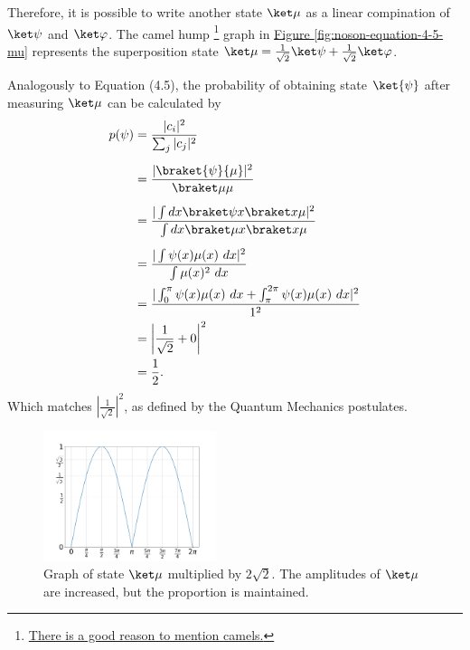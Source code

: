 Therefore, it is possible to write another state $\ket \mu$ as
a linear compination of $\ket \psi$ and $\ket \varphi$.
The camel hump
\footnote{\hyperlink{https://twitter.com/GustavowlKoruja/status/1100581409008336897}{
    There is a good reason to mention camels.}
}
graph in
\hyperref[fig:noson-equation-4-5-psi]{Figure \ref{fig:noson-equation-4-5-mu}}
represents the superposition state
$\ket\mu = \frac{1}{\sqrt2} \ket\psi + \frac{1}{\sqrt2} \ket\varphi$.

Analogously to Equation (4.5),
the probability of obtaining state $\ket{\psi}$ after measuring
$\ket \mu$ can be calculated by
\begin{align}
    p(\psi) &= \frac{|c_i|^2}{\sum_j |c_j|^2} \\[5pt]
    &= \frac{|\braket{\psi}{\mu}|^2}{\braket \mu \mu} \\[5pt]
    &= \frac{|\int dx \braket \psi x \braket x \mu|^2}{\int dx \braket \mu x \braket x \mu} \\[5pt]
    &= \frac{|\int \psi(x) \mu(x)\ dx|^2}{\int \mu(x)^2\ dx} \\
    &= \frac{|\int_0^\pi \psi(x) \mu(x)\ dx + \int_\pi^{2\pi} \psi(x) \mu(x)\ dx|^2}{1^2} \\
    &= \left| \frac{1}{\sqrt2} + 0 \right|^2 \\
    &= \frac 1 2.
\end{align}
Which matches $|\frac{1}{\sqrt2}|^2$,
as defined by the Quantum Mechanics postulates.

\begin{figure}[htb]
    \centering
    \includegraphics[width=0.45\textwidth]{img/noson/chapter04/section4_1/2-sqrt2-mu.png}
    \captionsetup{width=0.9\textwidth}
    \caption{Graph of state $\ket \mu$ multiplied  by $2 \sqrt2$.
        The amplitudes of $\ket \mu$ are increased,
        but the proportion is maintained.}
    \label{fig:noson-equation-4-5-2-sqrt2-mu}
\end{figure}

